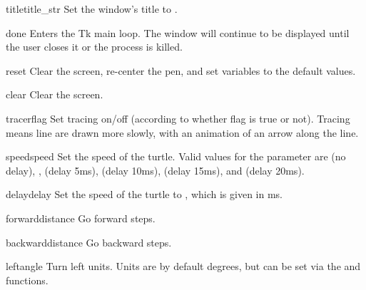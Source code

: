 \begin{funcdesc}{title}{title_str}
Set the window's title to .
\end{funcdesc}

\begin{funcdesc}{done}{}
Enters the Tk main loop.  The window will continue to 
be displayed until the user closes it or the process is killed.
\end{funcdesc}

\begin{funcdesc}{reset}{}
Clear the screen, re-center the pen, and set variables to the default
values.
\end{funcdesc}

\begin{funcdesc}{clear}{}
Clear the screen.
\end{funcdesc}

\begin{funcdesc}{tracer}{flag}
Set tracing on/off (according to whether flag is true or not). Tracing
means line are drawn more slowly, with an animation of an arrow along the 
line.
\end{funcdesc}

\begin{funcdesc}{speed}{speed}
Set the speed of the turtle. Valid values for the parameter
 are  (no delay), ,
(delay 5ms),  (delay 10ms), 
(delay 15ms), and  (delay 20ms).
\end{funcdesc}

\begin{funcdesc}{delay}{delay}
Set the speed of the turtle to , which is given
in ms. 
\end{funcdesc}

\begin{funcdesc}{forward}{distance}
Go forward  steps.
\end{funcdesc}

\begin{funcdesc}{backward}{distance}
Go backward  steps.
\end{funcdesc}

\begin{funcdesc}{left}{angle}
Turn left  units. Units are by default degrees, but can be
set via the  and  functions.
\end{funcdesc}

